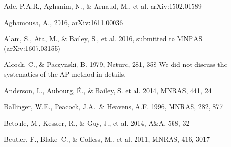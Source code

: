 \documentclass[twocolumn]{aastex61}
\begin{document}
\begin{thebibliography}{}

Ade, P.A.R., Aghanim, N., \& Arnaud, M., et al. arXiv:1502.01589

Aghamousa, A., 2016, arXiv:1611.00036


Alam, S., Ata, M., \& Bailey, S., et al. 2016,
submitted to MNRAS (arXiv:1607.03155)



Alcock, C., \& Paczynski, B. 1979, Nature, 281, 358  
We did not discuss the systematics of the AP method in details.


Anderson, L., Aubourg, \'E., \& Bailey, S. et al. 2014, MNRAS, 441, 24  
  

Ballinger, W.E., Peacock, J.A., \& Heavens, A.F. 1996, MNRAS, 282, 877  


Betoule, M., Kessler, R., \& Guy, J., et al. 2014, A\&A, 568, 32

Beutler, F., Blake, C., \& Colless, M., et al. 2011, MNRAS, 416, 3017




\end{thebibliography}
\end{document}
